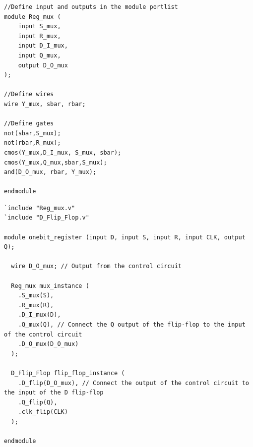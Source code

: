 \begin{lstlisting}[style=verilogStyle, caption=Register control circuit in Verilog, label=verilog_regmux]
//Define input and outputs in the module portlist
module Reg_mux (
    input S_mux,
    input R_mux,
    input D_I_mux,
    input Q_mux,
    output D_O_mux
);

//Define wires
wire Y_mux, sbar, rbar;	

//Define gates
not(sbar,S_mux);
not(rbar,R_mux); 
cmos(Y_mux,D_I_mux, S_mux, sbar);
cmos(Y_mux,Q_mux,sbar,S_mux);
and(D_O_mux, rbar, Y_mux);

endmodule
\end{lstlisting}


\begin{lstlisting}[style=verilogStyle, caption=One-bit register in Verilog, label=verilog_onebitregister]
`include "Reg_mux.v"
`include "D_Flip_Flop.v"

module onebit_register (input D, input S, input R, input CLK, output Q);

  wire D_O_mux; // Output from the control circuit

  Reg_mux mux_instance (
    .S_mux(S),
    .R_mux(R),
    .D_I_mux(D), 
    .Q_mux(Q), // Connect the Q output of the flip-flop to the input of the control circuit  
    .D_O_mux(D_O_mux)
  );

  D_Flip_Flop flip_flop_instance (
    .D_flip(D_O_mux), // Connect the output of the control circuit to the input of the D flip-flop
    .Q_flip(Q),
    .clk_flip(CLK)
  );

endmodule
\end{lstlisting}



